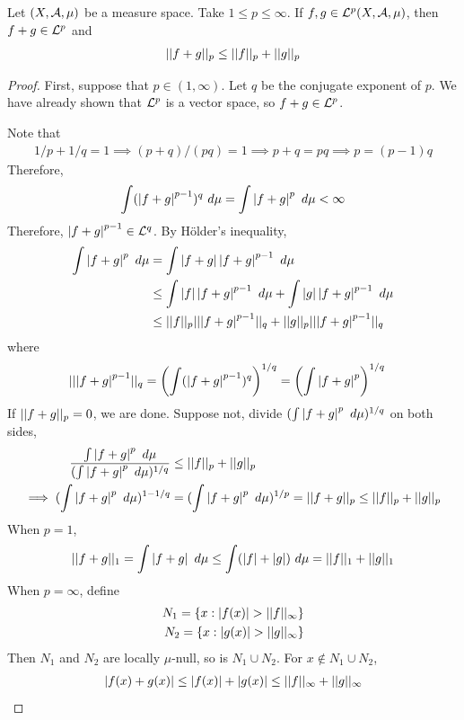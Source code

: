 \documentclass[11pt]{article}
\newcommand{\dmu}[0]{\ d\mu}
\begin{document}
	\begin{theorem}
		Let $(X, \mathcal{{A}}, \mu)$ be a measure space. Take $1 \leq p \leq \infty$. If $f, g \in \mathcal{{L}}^p(X, \mathcal{{A}}, \mu)$, then $f + g \in \mathcal{{L}}^p$ and
		\begin{align}
			\vert \vert {f+g} \vert \vert_p \leq \vert \vert {f} \vert \vert_p + \vert \vert {g} \vert \vert_p
		\end{align}
		\begin{proof}
			First, suppose that $p \in (1, \infty)$. Let $q$ be the conjugate exponent of $p$. We have already shown that $\mathcal{{L}}^p$ is a vector space, so $f + g \in \mathcal{{L}}^p$.
			
			Note that
			\begin{align}
				1/p + 1/q = 1 \implies (p+q)/(pq) = 1 \implies p + q = pq \implies p = (p-1)q
			\end{align}
			Therefore,
			\begin{align}
				\int (\abs{f+g}^{p-1})^q\dmu = \int \abs{f+g}^p\dmu < \infty
			\end{align}
			Therefore, $\left \vert {f+g} \right \vert^{p-1} \in \mathcal{{L}}^q$. By H\"older's inequality,
			\begin{align}
				\int \abs{f+g}^p\dmu &= \int \abs{f+g} \abs{f+g}^{p-1}\dmu \\
				&\leq \int \abs{f}\abs{f+g}^{p-1}\dmu + \int \abs{g}\abs{f+g}^{p-1}\dmu \\
				&\leq \norm{f}_p \norm{\abs{f+g}^{p-1}}_q  + \norm{g}_p \norm{\abs{f+g}^{p-1}}_q
			\end{align}
			where
			\begin{align}
				\vert \vert {\left \vert {f+g} \right \vert^{p-1}} \vert \vert_q &= \left(\int (\left \vert {f+g} \right \vert^{p-1})^q \right)^{1/q} = \left(\int \left \vert {f+g} \right \vert^p \right)^{1/q}
			\end{align}
			If $\vert \vert {f+g} \vert \vert_p = 0$, we are done. Suppose not, divide $(\int \abs{f+g}^p\dmu)^{1/q}$ on both sides,
			\begin{align}
				\frac{\int \abs{f+g}^p\dmu}{(\int \abs{f+g}^p\dmu)^{1/q}} &\leq \norm{f}_p + \norm{g}_p \\
				\implies (\int \abs{f+g}^p\dmu)^{1-1/q} &= (\int \abs{f+g}^p\dmu)^{1/p} = \norm{f+g}_p \leq \norm{f}_p + \norm{g}_p 
			\end{align}
			When $p = 1$,
			\begin{align}
				\norm{f+g}_1 = \int \abs{f+g}\dmu \leq \int (\abs{f}+\abs{g})\dmu = \norm{f}_1 + \norm{g}_1
			\end{align}
			When $p = \infty$, define
			\begin{align}
				N_1 = \{x: \left \vert {f(x)} \right \vert > \vert \vert {f} \vert \vert_\infty\} \\
				N_2 = \{x: \left \vert {g(x)} \right \vert > \vert \vert {g} \vert \vert_\infty\}
			\end{align}
			Then $N_1$ and $N_2$ are locally $\mu$-null, so is $N_1 \cup N_2$. For $x \notin N_1 \cup N_2$,
			\begin{align}
				\left \vert {f(x) + g(x)} \right \vert \leq \left \vert {f(x)} \right \vert + \left \vert {g(x)} \right \vert \leq \vert \vert {f} \vert \vert_\infty + \vert \vert {g} \vert \vert_\infty
			\end{align}
		\end{proof}
	\end{theorem}
\end{document}
